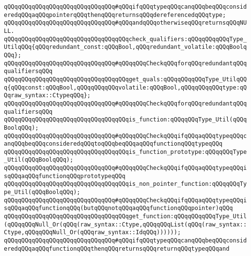 \verb|qQQqqQQqqQQqqQQqqQQqqQQqqQQqqQQq#qQQqifqQQqtypeqQQqcanqQQqbeqQQqconsideredqQQqaqQQqpointerqQQqthenqQQqreturnsqQQqdereferencedqQQqtype;|\newline
\verb|qQQqqQQqqQQqqQQqqQQqqQQqqQQqqQQq#qQQqandqQQqotherwiseqQQqreturnsqQQqNULL.|\newline
\newline
\newline
\verb|qQQqqQQqqQQqqQQqqQQqqQQqqQQqqQQqqQQqcheck_qualifiers:qQQqqQQqqQQqType_UtilqQQq{qQQqredundant_const:qQQqBool,qQQqredundant_volatile:qQQqBoolqQQq};|\newline
\verb|qQQqqQQqqQQqqQQqqQQqqQQqqQQqqQQq#qQQqqQQqCheckqQQqforqQQqredundantqQQqqualifiersqQQq|\newline
\newline
\verb|qQQqqQQqqQQqqQQqqQQqqQQqqQQqqQQqqQQqget_quals:qQQqqQQqqQQqType_UtilqQQq{qQQqconst:qQQqBool,qQQqqQQqqQQqvolatile:qQQqBool,qQQqqQQqqQQqtype:qQQqraw_syntax::CtypeqQQq};|\newline
\verb|qQQqqQQqqQQqqQQqqQQqqQQqqQQqqQQq#qQQqqQQqCheckqQQqforqQQqredundantqQQqqualifiersqQQq|\newline
\newline
\verb|qQQqqQQqqQQqqQQqqQQqqQQqqQQqqQQqqQQqis_function:qQQqqQQqType_Util(qQQqBoolqQQq);|\newline
\verb|qQQqqQQqqQQqqQQqqQQqqQQqqQQqqQQq#qQQqqQQqCheckqQQqifqQQqaqQQqtypeqQQqcanqQQqbeqQQqconsideredqQQqtoqQQqbeqQQqaqQQqfunctionqQQqtypeqQQq|\newline
\newline
\verb|qQQqqQQqqQQqqQQqqQQqqQQqqQQqqQQqqQQqis_function_prototype:qQQqqQQqType_Util(qQQqBoolqQQq);|\newline
\verb|qQQqqQQqqQQqqQQqqQQqqQQqqQQqqQQq#qQQqqQQqCheckqQQqifqQQqaqQQqtypeqQQqisqQQqaqQQqfunctionqQQqprototypeqQQq|\newline
\newline
\verb|qQQqqQQqqQQqqQQqqQQqqQQqqQQqqQQqqQQqis_non_pointer_function:qQQqqQQqType_Util(qQQqBoolqQQq);|\newline
\verb|qQQqqQQqqQQqqQQqqQQqqQQqqQQqqQQq#qQQqqQQqCheckqQQqifqQQqaqQQqtypeqQQqisqQQqaqQQqfunctionqQQq(butqQQqnotqQQqaqQQqfunctionqQQqpointer)qQQq|\newline
\newline
\verb|qQQqqQQqqQQqqQQqqQQqqQQqqQQqqQQqqQQqget_function:qQQqqQQqqQQqType_Util(qQQqqQQqNull_Or(qQQq(raw_syntax::Ctype,qQQqqQQqList(qQQq(raw_syntax::Ctype,qQQqqQQqNull_Or(qQQqraw_syntax::IdqQQq))))));|\newline
\verb|qQQqqQQqqQQqqQQqqQQqqQQqqQQqqQQq#qQQqifqQQqtypeqQQqcanqQQqbeqQQqconsideredqQQqaqQQqfunctionqQQqthenqQQqreturnsqQQqreturnqQQqtypeqQQqand|\newline
